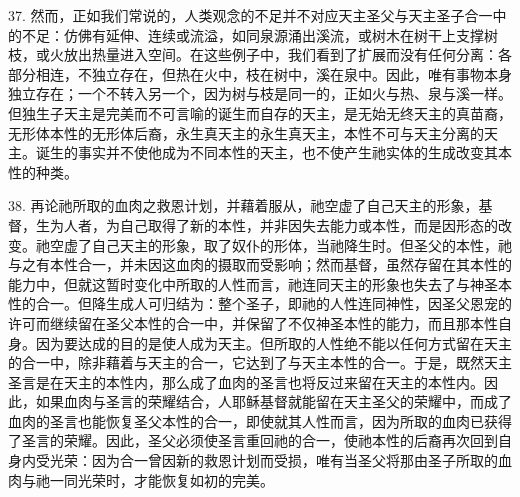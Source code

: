 37. 然而，正如我们常说的，人类观念的不足并不对应天主圣父与天主圣子合一中的不足：仿佛有延伸、连续或流溢，如同泉源涌出溪流，或树木在树干上支撑树枝，或火放出热量进入空间。在这些例子中，我们看到了扩展而没有任何分离：各部分相连，不独立存在，但热在火中，枝在树中，溪在泉中。因此，唯有事物本身独立存在；一个不转入另一个，因为树与枝是同一的，正如火与热、泉与溪一样。但独生子天主是完美而不可言喻的诞生而自存的天主，是无始无终天主的真苗裔，无形体本性的无形体后裔，永生真天主的永生真天主，本性不可与天主分离的天主。诞生的事实并不使他成为不同本性的天主，也不使产生祂实体的生成改变其本性的种类。\par

38. 再论祂所取的血肉之救恩计划，并藉着服从，祂空虚了自己天主的形象，基督，生为人者，为自己取得了新的本性，并非因失去能力或本性，而是因形态的改变。祂空虚了自己天主的形象，取了奴仆的形体，当祂降生时。但圣父的本性，祂与之有本性合一，并未因这血肉的摄取而受影响；然而基督，虽然存留在其本性的能力中，但就这暂时变化中所取的人性而言，祂连同天主的形象也失去了与神圣本性的合一。但降生成人可归结为：整个圣子，即祂的人性连同神性，因圣父恩宠的许可而继续留在圣父本性的合一中，并保留了不仅神圣本性的能力，而且那本性自身。因为要达成的目的是使人成为天主。但所取的人性绝不能以任何方式留在天主的合一中，除非藉着与天主的合一，它达到了与天主本性的合一。于是，既然天主圣言是在天主的本性内，那么成了血肉的圣言也将反过来留在天主的本性内。因此，如果血肉与圣言的荣耀结合，人耶稣基督就能留在天主圣父的荣耀中，而成了血肉的圣言也能恢复圣父本性的合一，即使就其人性而言，因为所取的血肉已获得了圣言的荣耀。因此，圣父必须使圣言重回祂的合一，使祂本性的后裔再次回到自身内受光荣：因为合一曾因新的救恩计划而受损，唯有当圣父将那由圣子所取的血肉与祂一同光荣时，才能恢复如初的完美。\par

